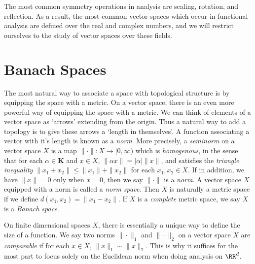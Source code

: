 The most common symmetry operations in analysis are scaling, rotation, and reflection. As a result, the most common vector spaces which occur in functional analysis are defined over the real and complex numbers, and we will restrict ourselves to the study of vector spaces over these fields.





\chapter{Banach Spaces}

The most natural way to associate a space with topological structure is by equipping the space with a metric. On a vector space, there is an even more powerful way of equipping the space with a metric. We can think of elements of a vector space as `arrows' extending from the origin. Thus a natural way to add a topology is to give these arrows a `length in themselves'. A function associating a vector with it's length is known as a {\it norm}. More precisely, a \emph{seminorm} on a vector space $X$ is a map $\| \cdot \|: X \to [0,\infty)$ which is {\it homogenous}, in the sense that for each $\alpha \in \mathbf{K}$ and $x \in X$, $\| \alpha x \| = |\alpha| \| x \|$, and satisfies the {\it triangle inequality} $\| x_1 + x_2 \| \leq \| x_1 \| + \| x_2 \|$ for each $x_1,x_2 \in X$. If in addition, we have $\| x \| = 0$ only when $x = 0$, then we say $\| \cdot \|$ is a {\it norm}. A vector space $X$ equipped with a norm is called a {\it norm space}. Then $X$ is naturally a metric space if we define $d(x_1,x_2) = \| x_1 - x_2 \|$. If $X$ is a \emph{complete} metric space, we say $X$ is a \emph{Banach space}.

On finite dimensional spaces $X$, there is essentially a unique way to define the size of a function. We say two norms $\| \cdot \|_1$ and $\| \cdot \|_2$ on a vector space $X$ are {\it comparable} if for each $x \in X$, $\| x \|_1 \sim \| x \|_2$. This is why it suffices for the most part to focus solely on the Euclidean norm when doing analysis on $\RR^d$.

